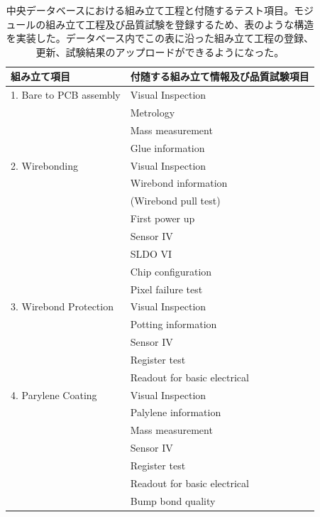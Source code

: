 \begin{table}[btp]
\begin{center}
\caption[中央データベースにおける組み立て工程と付随するテスト項目]{中央データベースにおける組み立て工程と付随するテスト項目。モジュールの組み立て工程及び品質試験を登録するため、表のような構造を実装した。データベース内でこの表に沿った組み立て工程の登録、更新、試験結果のアップロードができるようになった。}
\label{pd_stage_structure}
  \scriptsize
  \begin{tabular}{|ll|} \hline
    組み立て項目 & 付随する組み立て情報及び品質試験項目 \\ \hline
    1. Bare to PCB assembly & Visual Inspection \\ 
                            & Metrology \\
                            & Mass measurement \\
                            & Glue information \\\hline
    2. Wirebonding          & Visual Inspection \\ 
                            & Wirebond information \\
                            & (Wirebond pull test)\\
                            & First power up\\
                            & Sensor IV\\
                            & SLDO VI\\
                            & Chip configuration\\
                            & Pixel failure test\\\hline

    3. Wirebond Protection  & Visual Inspection \\ 
                            & Potting information \\
                            & Sensor IV \\
                            & Register test\\
                            & Readout for basic electrical \\\hline

    4. Parylene Coating     & Visual Inspection \\ 
                            & Palylene information \\
                            & Mass measurement \\
                            & Sensor IV \\
                            & Register test\\
                            & Readout for basic electrical \\
                            & Bump bond quality \\\hline


\end{tabular}
\end{center}
\end{table}

